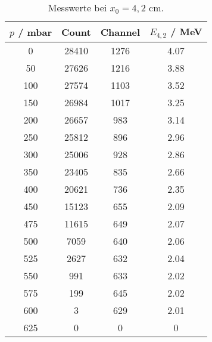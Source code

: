 \begin{table}[!htp]
\centering
\caption{Messwerte bei $x_0 = 4,2$ cm.}
\label{tab:d42cm}
\begin{tabular}{S[table-format=3.0] S[table-format=5.0] S[table-format=4.0] S[table-format=1.2]}
\toprule
{$p$ / mbar} & {Count} & {Channel} & {$E_{4,2}$ / MeV} \\
 & 28410 & 1276 & 4.07 \\
 50 & 27626 & 1216 & 3.88 \\
100 & 27574 & 1103 & 3.52 \\
150 & 26984 & 1017 & 3.25 \\
200 & 26657 &  983 & 3.14 \\
250 & 25812 &  896 & 2.96 \\
300 & 25006 &  928 & 2.86 \\
350 & 23405 &  835 & 2.66 \\
400 & 20621 &  736 & 2.35 \\
450 & 15123 &  655 & 2.09 \\
475 & 11615 &  649 & 2.07 \\
500 &  7059 &  640 & 2.06 \\
525 &  2627 &  632 & 2.04 \\
550 &   991 &  633 & 2.02 \\
575 &   199 &  645 & 2.02 \\
600 &     3 &  629 & 2.01 \\
625 &     0 &    0 & 0 \\
\bottomrule
\end{tabular}
\end{table}